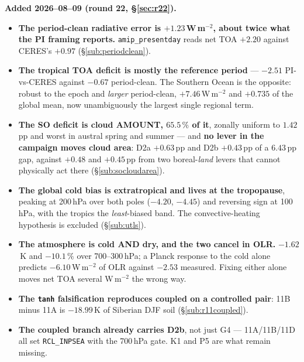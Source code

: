 \documentclass[10pt]{article}
\begin{document}
\textbf{Added 2026--08--09 (round 22, \S\ref{sec:r22}).}
\begin{itemize}\itemsep2pt
\item \textbf{The period-clean radiative error is $+1.23$\,W\,m$^{-2}$, about twice what
the PI framing reports.} \texttt{amip\_presentday} reads net TOA $+2.20$ against CERES's
$+0.97$ (\S\ref{sub:periodclean}).
\item \textbf{The tropical TOA deficit is mostly the reference period} --- $-2.51$
PI-vs-CERES against $-0.67$ period-clean. The Southern Ocean is the opposite: robust to
the epoch and \emph{larger} period-clean, $+7.46$\,W\,m$^{-2}$ and $+0.735$ of the global
mean, now unambiguously the largest single regional term.
\item \textbf{The SO deficit is cloud AMOUNT, $65.5\,\%$ of it}, zonally uniform to
$1.42$\,pp and worst in austral spring and summer --- and \textbf{no lever in the campaign
moves cloud area}: D2a $+0.63$\,pp and D2b $+0.43$\,pp of a $6.43$\,pp gap, against
$+0.48$ and $+0.45$\,pp from two boreal-\emph{land} levers that cannot physically act
there (\S\ref{sub:socloudarea}).
\item \textbf{The global cold bias is extratropical and lives at the tropopause}, peaking
at 200\,hPa over both poles ($-4.20$, $-4.45$) and reversing sign at 100\,hPa, with the
tropics the \emph{least}-biased band. The convective-heating hypothesis is excluded
(\S\ref{sub:utls}).
\item \textbf{The atmosphere is cold AND dry, and the two cancel in OLR.} $-1.62$\,K and
$-10.1\,\%$ over 700--300\,hPa; a Planck response to the cold alone predicts
$-6.10$\,W\,m$^{-2}$ of OLR against $-2.53$ measured. Fixing either alone moves net TOA
several W\,m$^{-2}$ the wrong way.
\item \textbf{The \texttt{tanh} falsification reproduces coupled on a controlled pair}:
11B minus 11A is $-18.99$\,K of Siberian DJF soil (\S\ref{sub:r11coupled}).
\item \textbf{The coupled branch already carries D2b}, not just G4 --- 11A/11B/11D all set
\texttt{RCL\_INPSEA} with the 700\,hPa gate. K1 and P5 are what remain missing.
\end{itemize}
\end{document}
